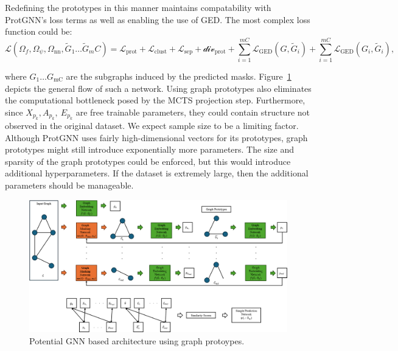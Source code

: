 \documentclass[
  11pt,
  letterpaper,
]{article}
\begin{document}
Redefining the prototypes in this manner maintains compatability with
ProtGNN's loss terms as well as enabling the use of GED. The most
complex loss function could be:\\
\begin{equation}
    \mathcal{L}(\Omega_f, \Omega_\psi, \Omega_\text{nn}, \tilde{G}_1 \dots \tilde{G}_mC) = \mathcal{L}_\text{prot} + \mathcal{L}_\text{clust} + \mathcal{L}_\text{sep} + \mathcal{div}_\text{prot} + \sum_{i = 1}^{mC} \mathcal{L}_\text{GED}(G, \tilde{G}_i) + \sum_{i = 1}^{mC} \mathcal{L}_\text{GED}(G_i, \tilde{G}_i), 
\end{equation}

where \(G_1 \dots G_\text{mC}\) are the subgraphs induced by the
predicted masks. Figure~\ref{fig-graph-prot_diag} depicts the general
flow of such a network. Using graph prototypes also eliminates the
computational bottleneck posed by the MCTS projection step. Furthermore,
since \(X_{p_k}, A_{p_k}, \ E_{p_k}\) are free trainable parameters,
they could contain structure not observed in the original dataset. We
expect sample size to be a limiting factor. Although ProtGNN uses fairly
high-dimensional vectors for its prototypes, graph prototypes might
still introduce exponentially more parameters. The size and sparsity of
the graph prototypes could be enforced, but this would introduce
additional hyperparameters. If the dataset is extremely large, then the
additional parameters should be manageable.

\begin{figure}

{\centering \includegraphics{figures/Graph_prot_diagram.png}

}

\caption{\label{fig-graph-prot_diag}Potential GNN based architecture
using graph protoypes.}

\end{figure}
\end{document}
